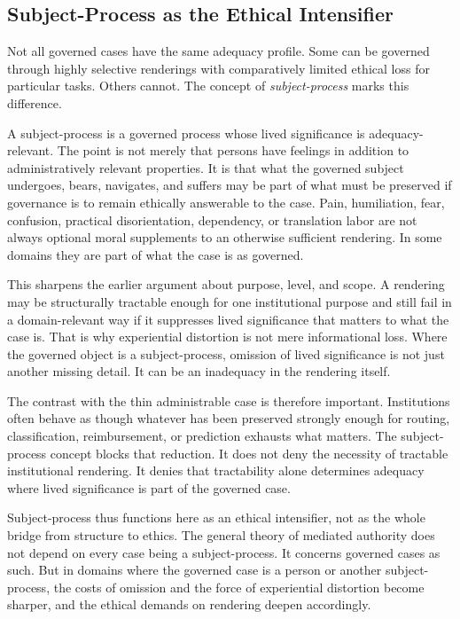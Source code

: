 \documentclass[11pt]{article}
\renewcommand{\emph}[1]{\textit{#1}}
\begin{document}
\subsection{Subject-Process as the Ethical Intensifier}

Not all governed cases have the same adequacy profile. Some can be governed through highly selective renderings with comparatively limited ethical loss for particular tasks. Others cannot. The concept of \emph{subject-process} marks this difference. \cite{Swanson2026EmbeddedProcess,Haraway1988SituatedKnowledges,Fricker2007EpistemicInjustice}

A subject-process is a governed process whose lived significance is adequacy-relevant. The point is not merely that persons have feelings in addition to administratively relevant properties. It is that what the governed subject undergoes, bears, navigates, and suffers may be part of what must be preserved if governance is to remain ethically answerable to the case. Pain, humiliation, fear, confusion, practical disorientation, dependency, or translation labor are not always optional moral supplements to an otherwise sufficient rendering. In some domains they are part of what the case is as governed.

This sharpens the earlier argument about purpose, level, and scope. A rendering may be structurally tractable enough for one institutional purpose and still fail in a domain-relevant way if it suppresses lived significance that matters to what the case is. That is why experiential distortion is not mere informational loss. Where the governed object is a subject-process, omission of lived significance is not just another missing detail. It can be an inadequacy in the rendering itself.

The contrast with the thin administrable case is therefore important. Institutions often behave as though whatever has been preserved strongly enough for routing, classification, reimbursement, or prediction exhausts what matters. The subject-process concept blocks that reduction. It does not deny the necessity of tractable institutional rendering. It denies that tractability alone determines adequacy where lived significance is part of the governed case.

Subject-process thus functions here as an ethical intensifier, not as the whole bridge from structure to ethics. The general theory of mediated authority does not depend on every case being a subject-process. It concerns governed cases as such. But in domains where the governed case is a person or another subject-process, the costs of omission and the force of experiential distortion become sharper, and the ethical demands on rendering deepen accordingly.
\end{document}
